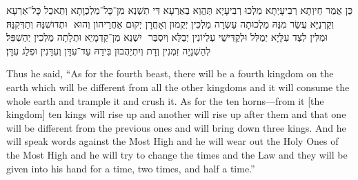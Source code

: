\begin{aramaictext}
    ‏כֵּן אֲמַר חֵיוְתָא רְבִיעָיְתָא מַלְכוּ רְבִיעָיָא תֶּהֱוֵא בְאַרְעָא דִּי תִשְׁנֵא מִן־כָּל־מַלְכְוָתָא וְתֵאכֻל כָּל־אַרְעָא וּתְדוּשִׁנַּהּ וְתַדְּקִנַּהּ׃ ‎
    ‏ וְקַרְנַיָּא עֲשַׂר מִנַּהּ מַלְכוּתָה עַשְׂרָה מַלְכִין יְקֻמוּן וְאָחֳרָן יְקוּם אַחֲרֵיהוֹן וְהוּא יִשְׁנֵא מִן־קַדְמָיֵא וּתְלָתָה מַלְכִין יְהַשְׁפִּל׃ ‎
    ‏ וּמִלִּין לְצַד עִלָּיָא יְמַלִּל וּלְקַדִּישֵׁי עֶלְיוֹנִין יְבַלֵּא וְיִסְבַּר לְהַשְׁנָיָה זִמְנִין וְדָת וְיִתְיַהֲבוּן בִּידֵהּ עַד־עִדָּן וְעִדָּנִין וּפְלַג עִדָּן׃
\end{aramaictext}

\begin{translation}
    Thus he said, ``As for the fourth beast, there will be a fourth kingdom on the earth which will be different from all the other kingdoms and it will consume the whole earth and trample it and crush it.
    As for the ten horns---from it [the kingdom] ten kings will rise up and another will rise up after them and that one will be different from the previous ones and will bring down three kings.
    And he will speak words against the Most High and he will wear out the Holy Ones of the Most High and he will try to change the times and the Law and they will be given into his hand for a time, two times, and half a time.''
\end{translation}

